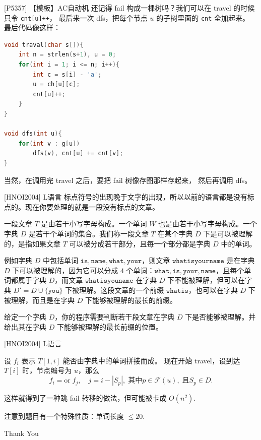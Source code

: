 \documentclass{beamer}
\begin{document}
\begin{frame}[fragile]{[P5357] 【模板】AC自动机}
    \footnotesize
    还记得 fail 构成一棵树吗？我们可以在 travel 的时候只令 \verb|cnt[u]++|，
    最后来一次 dfs，把每个节点 $u$ 的子树里面的 \verb|cnt| 全加起来。
    最后代码像这样：

    \begin{lstlisting}[language=c++]
void traval(char s[]){
    int n = strlen(s+1), u = 0;
    for(int i = 1; i <= n; i++){
        int c = s[i] - 'a';
        u = ch[u][c];
        cnt[u]++;
    }
}

void dfs(int u){
    for(int v : g[u])
        dfs(v), cnt[u] += cnt[v];
}
    \end{lstlisting}

    \pause
    当然，在调用完 travel 之后，要把 fail 树像存图那样存起来，
    然后再调用 dfs。
\end{frame}

\begin{frame}[fragile]{[HNOI2004] L语言}
    \footnotesize
    标点符号的出现晚于文字的出现，所以以前的语言都是没有标点的。现在你要处理的就是一段没有标点的文章。  

    \vspace{1em}
    一段文章 $T$ 是由若干小写字母构成。一个单词 $W$ 也是由若干小写字母构成。一个字典 $D$ 是若干个单词的集合。我们称一段文章 $T$ 在某个字典 $D$ 下是可以被理解的，是指如果文章 $T$ 可以被分成若干部分，且每一个部分都是字典 $D$ 中的单词。  
    
    \vspace{1em}
    例如字典 $D$ 中包括单词 $\texttt{is},\texttt{name},\texttt{what},\texttt{your}$，则文章 $\texttt{whatisyourname}$ 是在字典 $D$ 下可以被理解的，因为它可以分成 $4$ 个单词：$\texttt{what},\texttt{is},\texttt{your},\texttt{name}$，且每个单词都属于字典 $D$，而文章 $\texttt{whatisyouname}$ 在字典 $D$ 下不能被理解，但可以在字典 $D'=D\cup\{\texttt{you}\}$ 下被理解。这段文章的一个前缀 $\texttt{whatis}$，也可以在字典 $D$ 下被理解，而且是在字典 $D$ 下能够被理解的最长的前缀。  
    
    \vspace{1em}
    给定一个字典 $D$，你的程序需要判断若干段文章在字典 $D$ 下是否能够被理解。并给出其在字典 $D$ 下能够被理解的最长前缀的位置。
\end{frame}

\begin{frame}[fragile]{[HNOI2004] L语言}
    \footnotesize

    设 $f_i$ 表示 $T[1,i]$ 能否由字典中的单词拼接而成。\pause 
    现在开始 travel，设到达 $T[i]$ 时，节点编号为 $u$，那么
    \begin{equation*}
        f_i=\text{or}\; f_j,\quad j=i-|S_p|,\; \text{其中} p\in \mathcal{F}(u),\; \text{且} S_p\in D.
    \end{equation*}

    这样就得到了一种跳 fail 转移的做法，但可能被卡成 $O(n^2)$.

    \vspace{1em}\pause
    注意到题目有一个特殊性质：单词长度 $\leq 20$.
\end{frame}

\begin{frame}
    \begin{center}
        {\Huge\calligra Thank You}
    \end{center}
\end{frame}
\end{document}
